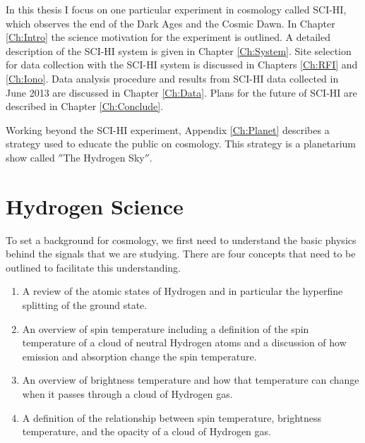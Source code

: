 In this thesis I focus on one particular experiment in \cm cosmology called SCI-HI, which observes the end of the Dark Ages and the Cosmic Dawn. In Chapter \ref{Ch:Intro} the science motivation for the experiment is outlined. A detailed description of the SCI-HI system is given in Chapter \ref{Ch:System}. Site selection for data collection with the SCI-HI system is discussed in Chapters \ref{Ch:RFI} and \ref{Ch:Iono}. Data analysis procedure and results from SCI-HI data collected in June 2013 are discussed in Chapter \ref{Ch:Data}. Plans for the future of SCI-HI are described in Chapter \ref{Ch:Conclude}. 

Working beyond the SCI-HI experiment, Appendix \ref{Ch:Planet} describes a strategy used to educate the public on \cm cosmology. This strategy is a planetarium show called $''$The Hydrogen Sky$''$. 



\section{Hydrogen \cm Science}

To set a background for \cm cosmology, we first need to understand the basic physics behind the signals that we are studying. There are four concepts that need to be outlined to facilitate this understanding. 

\begin{enumerate}

\item A review of the atomic states of Hydrogen and in particular the \cm hyperfine splitting of the ground state. 

\item An overview of spin temperature including a definition of the spin temperature of a cloud of neutral Hydrogen atoms and a discussion of how emission and absorption change the spin temperature. 

\item An overview of brightness temperature and how that temperature can change when it passes through a cloud of Hydrogen gas. 

\item A definition of the relationship between spin temperature, brightness temperature, and the opacity of a cloud of Hydrogen gas. 

\end{enumerate}

